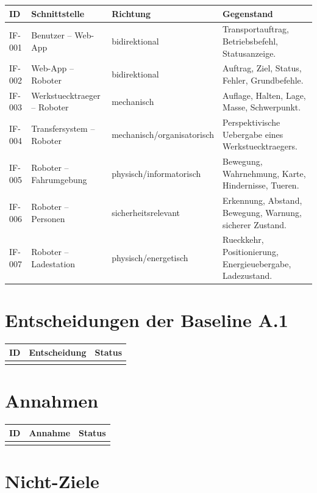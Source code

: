 \begin{longtable}{L{0.14\textwidth} L{0.22\textwidth} L{0.24\textwidth} L{0.26\textwidth}}
\toprule
ID & Schnittstelle & Richtung & Gegenstand \\
\midrule
IF-001 & Benutzer -- Web-App & bidirektional & Transportauftrag, Betriebsbefehl, Statusanzeige. \\
IF-002 & Web-App -- Roboter & bidirektional & Auftrag, Ziel, Status, Fehler, Grundbefehle. \\
IF-003 & Werkstuecktraeger -- Roboter & mechanisch & Auflage, Halten, Lage, Masse, Schwerpunkt. \\
IF-004 & Transfersystem -- Roboter & mechanisch/organisatorisch & Perspektivische Uebergabe eines Werkstuecktraegers. \\
IF-005 & Roboter -- Fahrumgebung & physisch/informatorisch & Bewegung, Wahrnehmung, Karte, Hindernisse, Tueren. \\
IF-006 & Roboter -- Personen & sicherheitsrelevant & Erkennung, Abstand, Bewegung, Warnung, sicherer Zustand. \\
IF-007 & Roboter -- Ladestation & physisch/energetisch & Rueckkehr, Positionierung, Energieuebergabe, Ladezustand. \\
\bottomrule
\end{longtable}

\section{Entscheidungen der Baseline A.1}

\begin{longtable}{L{0.14\textwidth} L{0.50\textwidth} L{0.20\textwidth}}
\toprule
ID & Entscheidung & Status \\
\midrule
{}
\bottomrule
\end{longtable}

\section{Annahmen}

\begin{longtable}{L{0.14\textwidth} L{0.56\textwidth} L{0.16\textwidth}}
\toprule
ID & Annahme & Status \\
\midrule
{}
\bottomrule
\end{longtable}

\section{Nicht-Ziele}

